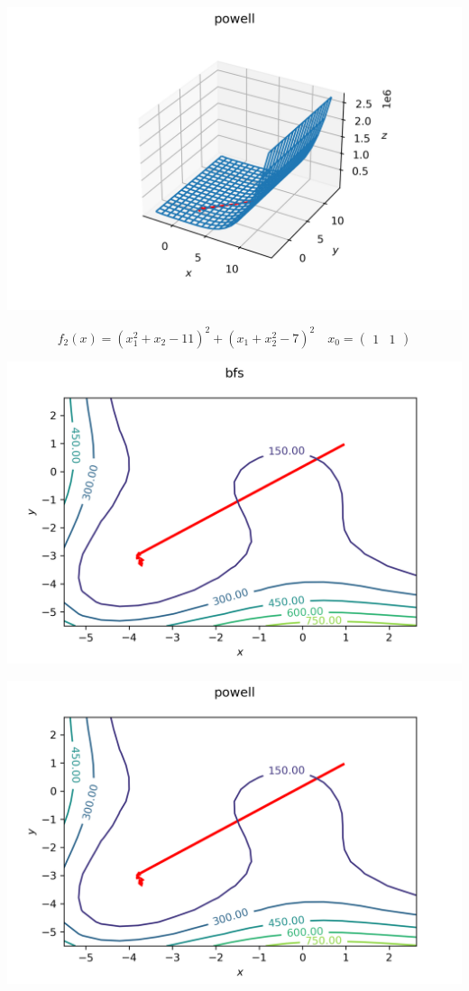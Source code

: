 \documentclass[english]{article}
\begin{document}
\begin{center}
  \includegraphics[scale=0.7]{plots/3D_powell_6.png}
\end{center}
\[ f_2(x) = (x_1^2 + x_2 - 11)^2 + (x_1 + x_2^2 - 7)^2 \quad x_0 = \begin{pmatrix}
  1 & 1
\end{pmatrix} \]
\begin{center}
  \includegraphics[scale=0.7]{plots/contours_bfs_7.png}
\end{center}
\begin{center}
  \includegraphics[scale=0.7]{plots/contours_powell_7.png}
\end{center}
\end{document}
